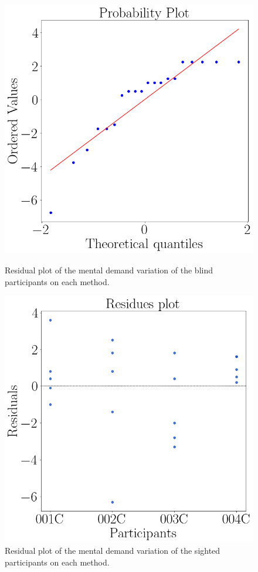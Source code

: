 

\begin{figure}[!htb]
    \centering
    \begin{minipage}{0.45\textwidth}
        \centering
        \includegraphics[width = 0.8\linewidth]{Resultados/Nasa/Figuras/png/qqplot_md_var_blind.png}
        \caption{Residual plot of the mental demand variation of the blind participants on each method.}
        \label{fig:qqplot_md_var_blind}
    \end{minipage}
    \begin{minipage}{0.45\textwidth}
        \centering
        \includegraphics[width = 0.8\linewidth]{Resultados/Nasa/Figuras/png/residplot_md_var_blind.png}
        \caption{Residual plot of the mental demand variation of the sighted participants on each method.}
        \label{fig:residplot_md_var_blind}
    \end{minipage}
\end{figure}

